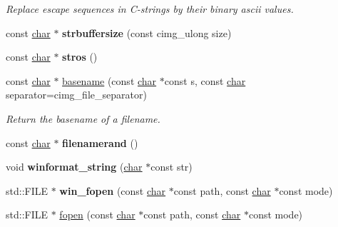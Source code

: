 \begin{DoxyCompactItemize}
\begin{DoxyCompactList}\small\item\em Replace escape sequences in C-\/strings by their binary ascii values. \end{DoxyCompactList}\item 
\mbox{\label{namespacecimg__library__suffixed_1_1cimg_a73a84376fb4f9577c5786ad58289efad}} 
const \hyperlink{classchar}{char} $\ast$ {\bfseries strbuffersize} (const cimg\+\_\+ulong size)
\item 
\mbox{\label{namespacecimg__library__suffixed_1_1cimg_ac2fe91fca3a53a6a86d6e4ba808c2061}} 
const \hyperlink{classchar}{char} $\ast$ {\bfseries stros} ()
\item 
\mbox{\label{namespacecimg__library__suffixed_1_1cimg_a40fb5fe2a0d260120909c617dfd3b07b}} 
const \hyperlink{classchar}{char} $\ast$ \hyperlink{namespacecimg__library__suffixed_1_1cimg_a40fb5fe2a0d260120909c617dfd3b07b}{basename} (const \hyperlink{classchar}{char} $\ast$const s, const \hyperlink{classchar}{char} separator=cimg\+\_\+file\+\_\+separator)
\begin{DoxyCompactList}\small\item\em Return the basename of a filename. \end{DoxyCompactList}\item 
\mbox{\label{namespacecimg__library__suffixed_1_1cimg_ae92216bbc140ed7afef601f72ba2bd81}} 
const \hyperlink{classchar}{char} $\ast$ {\bfseries filenamerand} ()
\item 
\mbox{\label{namespacecimg__library__suffixed_1_1cimg_a1b401761f9f3c1d01de8ec6ef6bec731}} 
void {\bfseries winformat\+\_\+string} (\hyperlink{classchar}{char} $\ast$const str)
\item 
\mbox{\label{namespacecimg__library__suffixed_1_1cimg_a9d486931d7eb759c7268b09a62cd3d28}} 
std\+::\+F\+I\+LE $\ast$ {\bfseries win\+\_\+fopen} (const \hyperlink{classchar}{char} $\ast$const path, const \hyperlink{classchar}{char} $\ast$const mode)
\item 
std\+::\+F\+I\+LE $\ast$ \hyperlink{namespacecimg__library__suffixed_1_1cimg_a9aafdb8732ff87625052ce2723f8a516}{fopen} (const \hyperlink{classchar}{char} $\ast$const path, const \hyperlink{classchar}{char} $\ast$const mode)

\end{DoxyCompactItemize}

